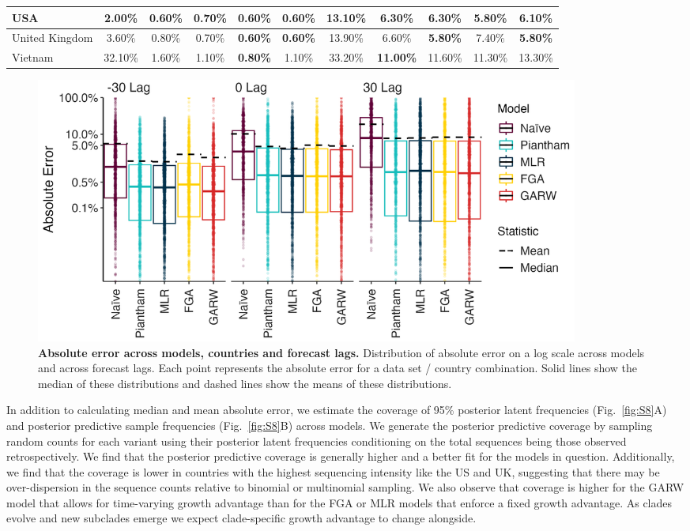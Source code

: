 \begin{table}[!ht]
\begin{adjustbox}{max width=\textwidth}
\begin{tabular}{|l|c|c|c|c|c|c|c|c|c|c|}
        USA & 2.00\% &\textbf{0.60\%} & 0.70\% & \textbf{0.60\%} & \textbf{0.60\%} & 13.10\% & 6.30\% & 6.30\% & \textbf{5.80\%} & 6.10\% \\ \hline
        United Kingdom & 3.60\% & 0.80\% & 0.70\% & \textbf{0.60\%} & \textbf{0.60\%} & 13.90\% & 6.60\% & \textbf{5.80\%} & 7.40\% & \textbf{5.80\%} \\ \hline
        Vietnam & 32.10\% & 1.60\% & 1.10\% & \textbf{0.80\%} & 1.10\% & 33.20\% & \textbf{11.00\%} & 11.60\% & 11.30\% & 13.30\% \\ \hline
    \end{tabular}
	\end{adjustbox}
\end{table}


\begin{figure}[tb!]
	\centering
	\includegraphics[width=0.87\textwidth]{figures/model_comp_B.png}
	\caption{\textbf{Absolute error across models, countries and forecast lags.}
	Distribution of absolute error on a log scale across models and across forecast lags.
	Each point represents the absolute error for a data set / country combination.
	Solid lines show the median of these distributions and dashed lines show the means of these distributions.
	}
	\label{fig:Fig3}
\end{figure}

In addition to calculating median and mean absolute error, we estimate the coverage of 95\% posterior latent frequencies (Fig.~\ref{fig:S8}A) and posterior predictive sample frequencies (Fig.~\ref{fig:S8}B) across models.
We generate the posterior predictive coverage by sampling random counts for each variant using their posterior latent frequencies conditioning on the total sequences being those observed retrospectively.
We find that the posterior predictive coverage is generally higher and a better fit for the models in question.
Additionally, we find that the coverage is lower in countries with the highest sequencing intensity like the US and UK, suggesting that there may be over-dispersion in the sequence counts relative to binomial or multinomial sampling.
We also observe that coverage is higher for the GARW model that allows for time-varying growth advantage than for the FGA or MLR models that enforce a fixed growth advantage.
As clades evolve and new subclades emerge we expect clade-specific growth advantage to change alongside.


